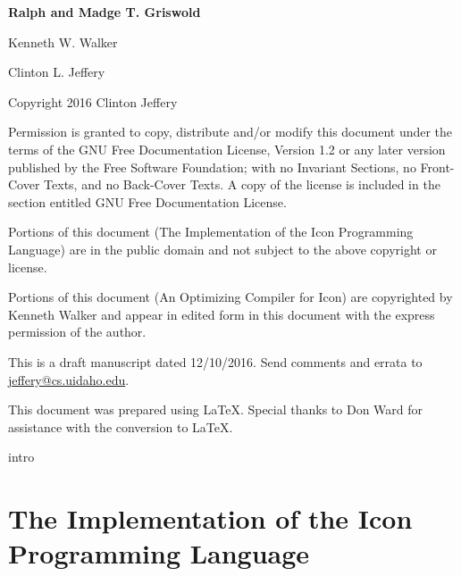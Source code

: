 \documentclass[letterpaper,twoside,11pt]{book}
\begin{document}
\bigskip
\bigskip
\bigskip
\bigskip
\bigskip
\bigskip
\bigskip

{\raggedleft\bfseries\Large
Ralph and Madge T. Griswold
\par
Kenneth W. Walker
\par
Clinton L. Jeffery 
\par}

\bigskip
\bigskip
\bigskip

\clearpage\setcounter{page}{1}\pagestyle{KonvertFolgeii}
\frontmatter
\bigskip
\bigskip
\noindent Copyright {\textcopyright} 2016 Clinton Jeffery


\noindent Permission is granted to copy, distribute and/or modify this document under the terms of the GNU Free Documentation
License, Version 1.2 or any later version published by the Free Software Foundation; with no Invariant Sections, no
Front-Cover Texts, and no Back-Cover Texts. A copy of the license is included in the section entitled
{\textquotedbl}GNU Free Documentation License{\textquotedbl}.

\noindent Portions of this document ({\textquotedbl}The Implementation of the Icon Programming Language{\textquotedbl}) are in the
public domain and not subject to the above copyright or license.

\noindent Portions of this document ({\textquotedbl}An Optimizing Compiler for Icon{\textquotedbl}) are copyrighted by Kenneth
Walker and appear in edited form in this document with the express permission of the author.


\bigskip


\noindent This is a draft manuscript dated 12/10/2016.
Send comments and errata to
\href{mailto:jeffery@cs.uidaho.edu}{jeffery@cs.uidaho.edu}.

\bigskip

\noindent This document was prepared using \LaTeX. Special thanks to Don Ward
for assistance with the conversion to \LaTeX.

\setcounter{tocdepth}{3}
\tableofcontents


\mainmatter
 {intro}

\part{The Implementation of the Icon Programming Language}













\end{document}
